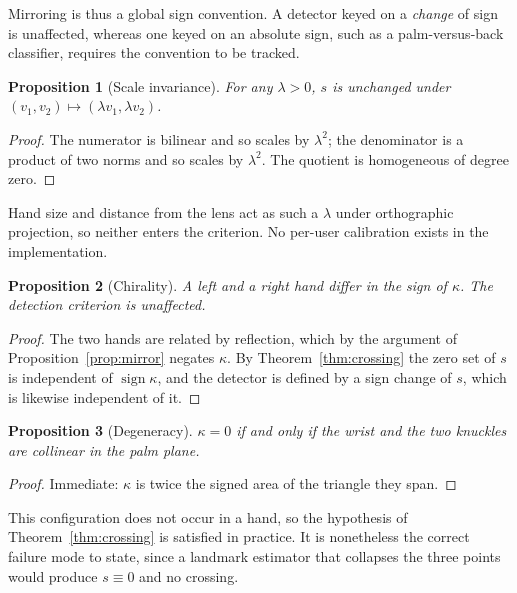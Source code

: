 \documentclass{article}
\newtheorem{proposition}{Proposition}
\theoremstyle{definition}
\begin{document}
Mirroring is thus a global sign convention. A detector keyed on a \emph{change}
of sign is unaffected, whereas one keyed on an absolute sign, such as a
palm-versus-back classifier, requires the convention to be tracked.

\begin{proposition}[Scale invariance]
\label{prop:scale}
For any $\lambda > 0$, $s$ is unchanged under $(v_1, v_2) \mapsto (\lambda v_1, \lambda v_2)$.
\end{proposition}

\begin{proof}
The numerator is bilinear and so scales by $\lambda^2$; the denominator is a
product of two norms and so scales by $\lambda^2$. The quotient is homogeneous of
degree zero.
\end{proof}

Hand size and distance from the lens act as such a $\lambda$ under orthographic
projection, so neither enters the criterion. No per-user calibration exists in
the implementation.

\begin{proposition}[Chirality]
\label{prop:chirality}
A left and a right hand differ in the sign of $\kappa$. The detection criterion
is unaffected.
\end{proposition}

\begin{proof}
The two hands are related by reflection, which by the argument of
Proposition~\ref{prop:mirror} negates $\kappa$. By
Theorem~\ref{thm:crossing} the zero set of $s$ is independent of
$\operatorname{sign}\kappa$, and the detector is defined by a sign change of $s$,
which is likewise independent of it.
\end{proof}

\begin{proposition}[Degeneracy]
$\kappa = 0$ if and only if the wrist and the two knuckles are collinear in the
palm plane.
\end{proposition}

\begin{proof}
Immediate: $\kappa$ is twice the signed area of the triangle they span.
\end{proof}

This configuration does not occur in a hand, so the hypothesis of
Theorem~\ref{thm:crossing} is satisfied in practice. It is nonetheless the
correct failure mode to state, since a landmark estimator that collapses the
three points would produce $s \equiv 0$ and no crossing.
\end{document}
